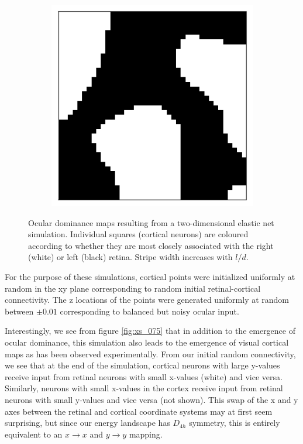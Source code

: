 \documentclass{article}
\begin{document}
\begin{figure}[h]
\begin{subfigure}[t]{0.23\linewidth}
		\label{fig:dom075}	
	\end{subfigure}%
		\hspace{0.03\linewidth}
	\begin{subfigure}[t]{0.23\linewidth}
		\centering
		\includegraphics[width = 1.0\linewidth, trim={5 5 5 10}, clip=true]{figures/N20M40l100d05_2_dominance.png}
		\label{fig:dom100}	
	\end{subfigure}%
\caption{Ocular dominance maps resulting from a two-dimensional elastic net simulation. Individual squares (cortical neurons) are coloured according to whether they are most closely associated with the right (white) or left (black) retina. Stripe width increases with $l/d$.}
\label{fig:widths}
\end{figure}

For the purpose of these simulations, cortical points were initialized uniformly at random in the xy plane corresponding to random initial retinal-cortical connectivity. The z locations of the points were generated uniformly at random between $\pm 0.01$ corresponding to balanced but noisy ocular input.

Interestingly, we see from figure \ref{fig:xs_075} that in addition to the emergence of ocular dominance, this simulation also leads to the emergence of visual cortical maps as has been observed experimentally. From our initial random connectivity, we see that at the end of the simulation, cortical neurons with large y-values receive input from retinal neurons with small x-values (white) and vice versa. Similarly, neurons with small x-values in the cortex receive input from retinal neurons with small y-values and vice versa (not shown). This swap of the x and y axes between the retinal and cortical coordinate systems may at first seem surprising, but since our energy landscape has $D_{4h}$ symmetry, this is entirely equivalent to an $x \rightarrow x$ and $y \rightarrow y$ mapping.
\end{document}
